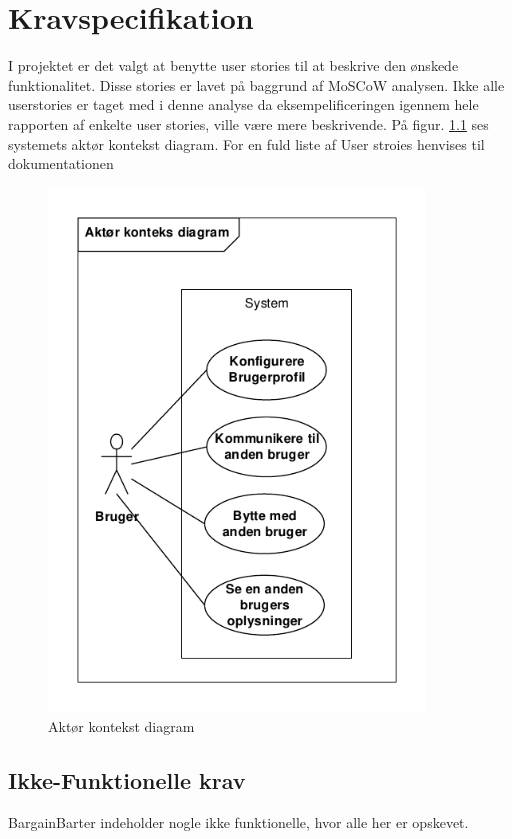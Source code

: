 \chapter{Kravspecifikation}

I projektet er det valgt at benytte user stories til at beskrive den ønskede funktionalitet. Disse stories er lavet på baggrund af MoSCoW analysen. Ikke alle userstories er taget med i denne analyse da eksempelificeringen igennem hele rapporten af enkelte user stories, ville være mere beskrivende. På figur. \ref{fig:KontekstDia} ses systemets aktør kontekst diagram. For en fuld liste af User stroies henvises til dokumentationen

\begin{figure}[H]
	\includegraphics[trim = 6mm 6mm 6mm 6mm, clip, width=100mm]{../Dokumentation/figures/KontekstDiagram.PDF}
	\caption{Aktør kontekst diagram}
	\label{fig:KontekstDia}
\end{figure}




\section{Ikke-Funktionelle krav}
BargainBarter indeholder nogle ikke funktionelle, hvor alle her er opskevet.
